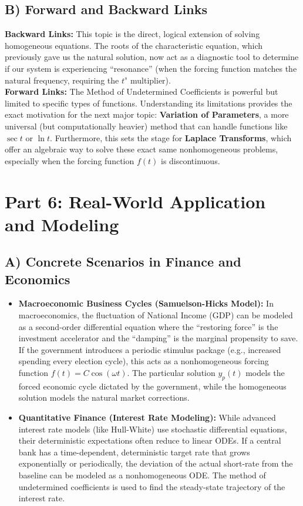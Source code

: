 \documentclass[12pt]{article}
\begin{document}
\subsection{B) Forward and Backward Links}
\textbf{Backward Links:} This topic is the direct, logical extension of solving homogeneous equations. The roots of the characteristic equation, which previously gave us the natural solution, now act as a diagnostic tool to determine if our system is experiencing ``resonance'' (when the forcing function matches the natural frequency, requiring the $t^s$ multiplier). \\
\textbf{Forward Links:} The Method of Undetermined Coefficients is powerful but limited to specific types of functions. Understanding its limitations provides the exact motivation for the next major topic: \textbf{Variation of Parameters}, a more universal (but computationally heavier) method that can handle functions like $\sec t$ or $\ln t$. Furthermore, this sets the stage for \textbf{Laplace Transforms}, which offer an algebraic way to solve these exact same nonhomogeneous problems, especially when the forcing function $f(t)$ is discontinuous.

\newpage
\section{Part 6: Real-World Application and Modeling}

\subsection{A) Concrete Scenarios in Finance and Economics}
\begin{itemize}
    \item \textbf{Macroeconomic Business Cycles (Samuelson-Hicks Model):} In macroeconomics, the fluctuation of National Income (GDP) can be modeled as a second-order differential equation where the ``restoring force'' is the investment accelerator and the ``damping'' is the marginal propensity to save. If the government introduces a periodic stimulus package (e.g., increased spending every election cycle), this acts as a nonhomogeneous forcing function $f(t) = C \cos(\omega t)$. The particular solution $y_p(t)$ models the forced economic cycle dictated by the government, while the homogeneous solution models the natural market corrections.
    \item \textbf{Quantitative Finance (Interest Rate Modeling):} While advanced interest rate models (like Hull-White) use stochastic differential equations, their deterministic expectations often reduce to linear ODEs. If a central bank has a time-dependent, deterministic target rate that grows exponentially or periodically, the deviation of the actual short-rate from the baseline can be modeled as a nonhomogeneous ODE. The method of undetermined coefficients is used to find the steady-state trajectory of the interest rate.
\end{itemize}
\end{document}
